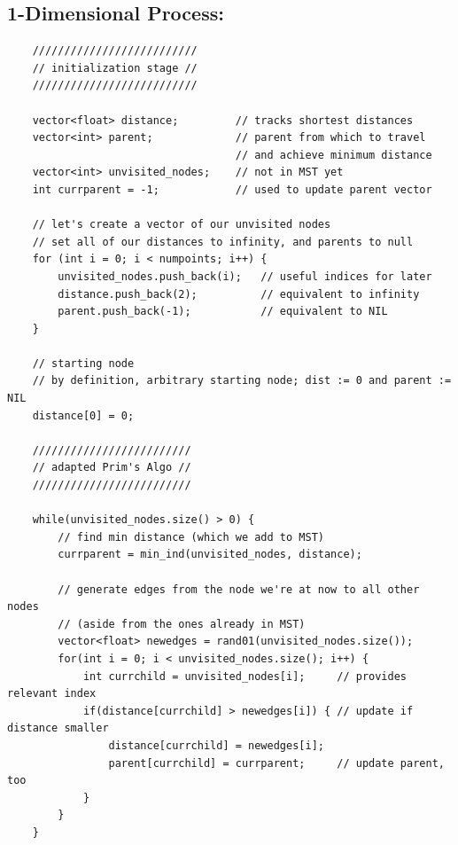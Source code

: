 \documentclass[conference]{styles/acmsiggraph}
\newcommand{\?}{\stackrel{?}{=}}
\begin{document}
\subsection{1-Dimensional Process:} \label{1DCode}
\begin{verbatim}
    //////////////////////////
    // initialization stage //
    //////////////////////////
    
    vector<float> distance;         // tracks shortest distances
    vector<int> parent;             // parent from which to travel 
                                    // and achieve minimum distance
    vector<int> unvisited_nodes;    // not in MST yet
    int currparent = -1;            // used to update parent vector
    
    // let's create a vector of our unvisited nodes
    // set all of our distances to infinity, and parents to null
    for (int i = 0; i < numpoints; i++) {
        unvisited_nodes.push_back(i);   // useful indices for later
        distance.push_back(2);          // equivalent to infinity
        parent.push_back(-1);           // equivalent to NIL
    }

    // starting node
    // by definition, arbitrary starting node; dist := 0 and parent := NIL
    distance[0] = 0;         
    
    /////////////////////////
    // adapted Prim's Algo //
    /////////////////////////

    while(unvisited_nodes.size() > 0) {
        // find min distance (which we add to MST)
        currparent = min_ind(unvisited_nodes, distance);                      

        // generate edges from the node we're at now to all other nodes 
        // (aside from the ones already in MST)
        vector<float> newedges = rand01(unvisited_nodes.size());
        for(int i = 0; i < unvisited_nodes.size(); i++) {
            int currchild = unvisited_nodes[i];     // provides relevant index
            if(distance[currchild] > newedges[i]) { // update if distance smaller  
                distance[currchild] = newedges[i];
                parent[currchild] = currparent;     // update parent, too
            }
        }
    }
\end{verbatim}
\end{document}
